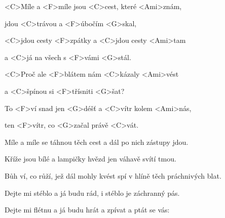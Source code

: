 

\zs
<C>Míle a <F>míle jsou <C>cest, které <Ami>znám,

jdou <C>trávou a <F>úbočím <G>skal,

<C>jdou cesty <F>zpátky a <C>jdou cesty <Ami>tam

a <C>já na všech s <F>vámi <G>stál.

<C>Proč ale <F>blátem nám <C>kázaly <Ami>vést

a <C>špínou si <F>třísniti <G>šat?
\ks

\zr
To <F>ví snad jen <G>déšť a <C>vítr kolem <Ami>nás,

ten <F>vítr, co <G>začal právě <C>vát.
\kr

\zs
Míle a míle se táhnou těch cest a dál po nich zástupy jdou.

Kříže jsou bílé a lampičky hvězd jen váhavě svítí tmou.

Bůh ví, co růží, jež dál mohly kvést spí v hlíně těch práchnivých blat.
\ks

\zr\kr

\zs
Dejte mi stéblo a já budu rád, i stéblo je záchranný pás.

Dejte mi flétnu a já budu hrát a zpívat a ptát se vás:

\ks

\zr\kr

\kp
